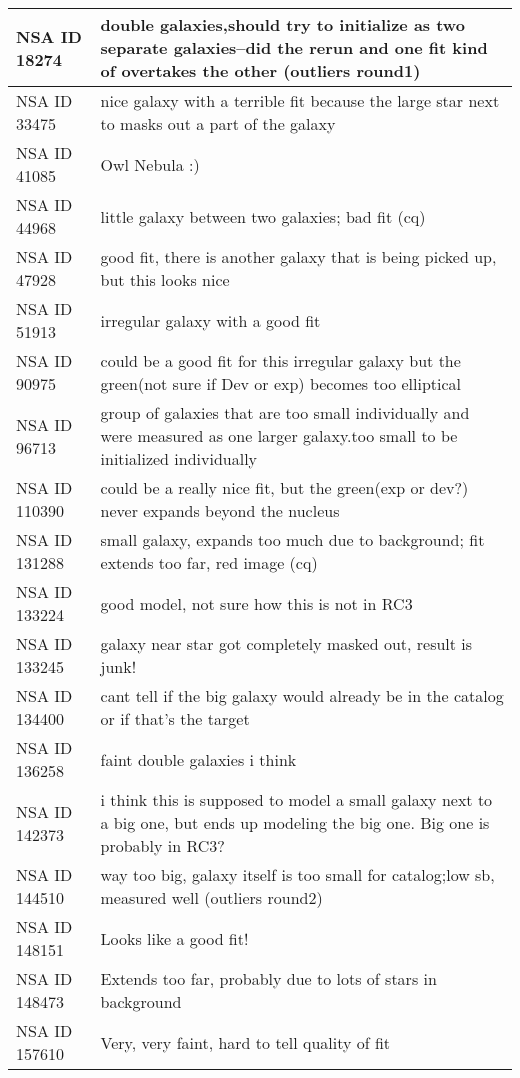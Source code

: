 \documentclass[10pt]{article}
\begin{document}
\begin{landscape}
\begin{longtable}{|l|l|}
NSA ID 18274 & double galaxies,should try to initialize as two separate galaxies--did the rerun and one fit kind of overtakes the other (outliers round1)\\ \hline
NSA ID 33475 & nice galaxy with a terrible fit because the large star next to masks out a part of the galaxy\\ \hline
NSA ID 41085 & Owl Nebula :)\\ \hline
NSA ID 44968 & little galaxy between two galaxies; bad fit (cq)\\ \hline
NSA ID 47928 & good fit, there is another galaxy that is being picked up, but this looks nice\\ \hline
NSA ID 51913 & irregular galaxy with a good fit\\ \hline
NSA ID 90975 & could be a good fit for this irregular galaxy but the green(not sure if Dev or exp) becomes too elliptical\\ \hline
NSA ID 96713 & group of galaxies that are too small individually and were measured as one larger galaxy.too small to be initialized individually\\ \hline
NSA ID 110390 & could be a really nice fit, but the green(exp or dev?) never expands beyond the nucleus\\ \hline
NSA ID 131288 & small galaxy, expands too much due to background; fit extends too far, red image (cq)\\ \hline
NSA ID 133224 & good model, not sure how this is not in RC3\\ \hline
NSA ID 133245 & galaxy near star got completely masked out, result is junk!\\ \hline
NSA ID 134400 & cant tell if the big galaxy would already be in the catalog or if that's the target\\ \hline
NSA ID 136258 & faint double galaxies i think\\ \hline
NSA ID 142373 & i think this is supposed to model a small galaxy next to a big one, but ends up modeling the big one. Big one is probably in RC3?\\ \hline
NSA ID 144510 & way too big, galaxy itself is too small for catalog;low sb, measured well (outliers round2)\\ \hline
NSA ID 148151 & Looks like a good fit!\\ \hline
NSA ID 148473 & Extends too far, probably due to lots of stars in background\\ \hline
NSA ID 157610 & Very, very faint, hard to tell quality of fit\\ \hline

\end{longtable}
\end{landscape}
\end{document}
